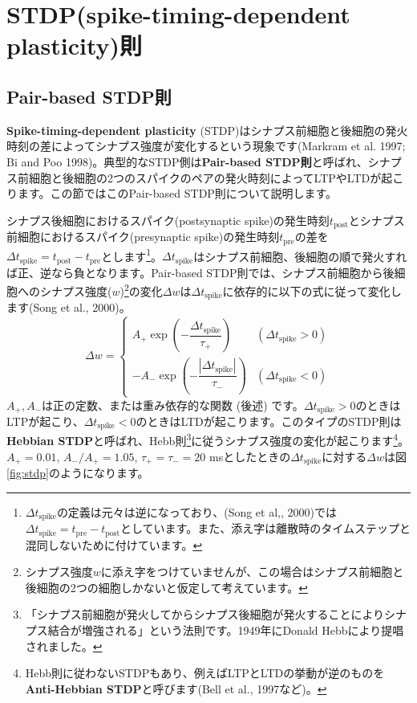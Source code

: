 \section{STDP(spike-timing-dependent plasticity)則}
\subsection{Pair-based STDP則}
\textbf{Spike-timing-dependent plasticity} (STDP)はシナプス前細胞と後細胞の発火時刻の差によってシナプス強度が変化するという現象です(Markram et al. 1997; Bi and Poo 1998)。典型的なSTDP側は\textbf{Pair-based STDP則}と呼ばれ、シナプス前細胞と後細胞の2つのスパイクのペアの発火時刻によってLTPやLTDが起こります。この節ではこのPair-based STDP則について説明します。\par
シナプス後細胞におけるスパイク(postsynaptic spike)の発生時刻$t_\text{post}$とシナプス前細胞におけるスパイク(presynaptic spike)の発生時刻$t_\text{pre}$の差を$\Delta t_{\text{spike}}=t_\text{post}-t_\text{pre}$とします\footnote{$\Delta t_{\text{spike}}$の定義は元々は逆になっており、(Song et al,, 2000)では$\Delta t_{\text{spike}}=t_\text{pre}-t_\text{post}$としています。また、添え字は離散時のタイムステップと混同しないために付けています。}。$\Delta t_{\text{spike}}$はシナプス前細胞、後細胞の順で発火すれば正、逆なら負となります。Pair-based STDP則では、シナプス前細胞から後細胞へのシナプス強度($w$)\footnote{シナプス強度$w$に添え字をつけていませんが、この場合はシナプス前細胞と後細胞の2つの細胞しかないと仮定して考えています。}の変化$\Delta w$は$\Delta t_{\text{spike}}$に依存的に以下の式に従って変化します(Song et al., 2000)。
\begin{equation}
\Delta w = \begin{cases}
A_{+} \exp\left(-\dfrac{\Delta t_{\text{spike}}}{\tau_{+}}\right) &(\Delta t_{\text{spike}}> 0) \\
-A_{-} \exp\left(-\dfrac{|\Delta t_{\text{spike}}|}{\tau_{-}}\right) &(\Delta t_{\text{spike}}< 0)
\end{cases}
\end{equation}
$A_+, A_-$は正の定数、または重み依存的な関数 (後述) です。$\Delta t_{\text{spike}}>0$のときはLTPが起こり、$\Delta t_{\text{spike}}<0$のときはLTDが起こります。このタイプのSTDP則は\textbf{Hebbian STDP}と呼ばれ、Hebb則\footnote{「シナプス前細胞が発火してからシナプス後細胞が発火することによりシナプス結合が増強される」という法則です。1949年にDonald Hebbにより提唱されました。}に従うシナプス強度の変化が起こります\footnote{Hebb則に従わないSTDPもあり、例えばLTPとLTDの挙動が逆のものを\textbf{Anti-Hebbian STDP}と呼びます(Bell et al., 1997など)。}。
$A_+=0.01$, $A_-/A_+=1.05$, $\tau_{+}=\tau_{-}=20$ msとしたときの$\Delta t_{\text{spike}}$に対する$\Delta w$は図\ref{fig:stdp}のようになります。

